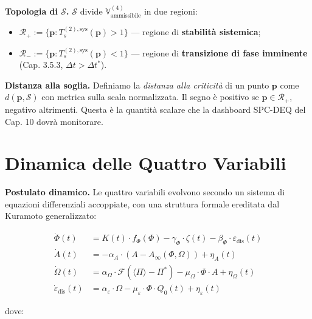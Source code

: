 \Hypoth{} \textbf{Topologia di \(\mathcal{S}\).} \(\mathcal{S}\) divide
\(\mathbb{V}^{(4)}_{\text{ammissibile}}\) in due regioni:

\begin{itemize}
\tightlist
\item
  \(\mathcal{R}_+ := \{\boldsymbol{p} : T_s^{(2),\text{sys}}(\boldsymbol{p}) > 1\}\)
  --- regione di \textbf{stabilità sistemica};
\item
  \(\mathcal{R}_- := \{\boldsymbol{p} : T_s^{(2),\text{sys}}(\boldsymbol{p}) < 1\}\)
  --- regione di \textbf{transizione di fase imminente} (Cap. 3.5.3,
  \(\Delta t > \Delta t^*\)).
\end{itemize}

\Hypoth{} \textbf{Distanza alla soglia.} Definiamo la \emph{distanza
alla criticità} di un punto \(\boldsymbol{p}\) come
\(d(\boldsymbol{p}, \mathcal{S})\) con metrica sulla scala normalizzata.
Il segno è positivo se \(\boldsymbol{p} \in \mathcal{R}_+\), negativo
altrimenti. Questa è la quantità scalare che la dashboard SPC-DEQ del
Cap. 10 dovrà monitorare.



\section{Dinamica delle Quattro
Variabili}\label{dinamica-delle-quattro-variabili}

\Hypoth{} \textbf{Postulato dinamico.} Le quattro variabili evolvono
secondo un sistema di equazioni differenziali accoppiate, con una
struttura formale ereditata dal Kuramoto generalizzato:

\[
\begin{aligned}
\dot{\Phi}(t) &= K(t) \cdot f_\Phi(\Phi) - \gamma_\Phi \cdot \zeta(t) - \beta_\Phi \cdot \varepsilon_{\text{dis}}(t) \\
\dot{A}(t) &= -\alpha_A \cdot (A - A_\infty(\Phi, \Omega)) + \eta_A(t) \\
\dot{\Omega}(t) &= \alpha_\Omega \cdot \mathcal{F}(\langle\Pi\rangle - \Pi^*) - \mu_\Omega \cdot \Phi \cdot A + \eta_\Omega(t) \\
\dot{\varepsilon}_{\text{dis}}(t) &= \alpha_\varepsilon \cdot \Omega - \mu_\varepsilon \cdot \Phi \cdot Q_0(t) + \eta_\varepsilon(t)
\end{aligned}
\]

dove:

